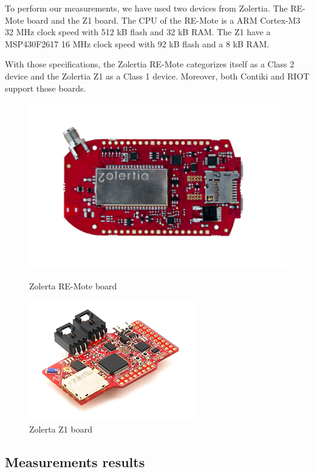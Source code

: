 To perform our measurements, we have used two devices from Zolertia.
The RE-Mote board\cite{zolertia-remote} and the Z1 board\cite{zolertia-z1}.
The CPU of the RE-Mote is a ARM Cortex-M3\cite{arm-cortex-m3} 32 MHz clock speed with 512 kB flash and 32 kB RAM.
The Z1 have a MSP430F2617\cite{msp430} 16 MHz clock speed with 92 kB flash and a 8 kB RAM.

With those specifications, the Zolertia RE-Mote categorizes itself as a Class 2 device and the Zolertia Z1 as a Class 1 device.
Moreover, both Contiki and RIOT support those boards.

\begin{figure}[!ht]
    \begin{minipage}{.45\textwidth}
        \centering
        \includegraphics[scale=.5]{assets/remote.png}
        \caption{Zolerta RE-Mote board}
    \end{minipage}\hfill
    \begin{minipage}{.45\textwidth}        
        \centering
        \includegraphics[scale=2.5]{assets/z1.png}
        \caption{Zolerta Z1 board}
    \end{minipage}
\end{figure}

\subsection{Measurements results\label{sec:ref-measurements}}

